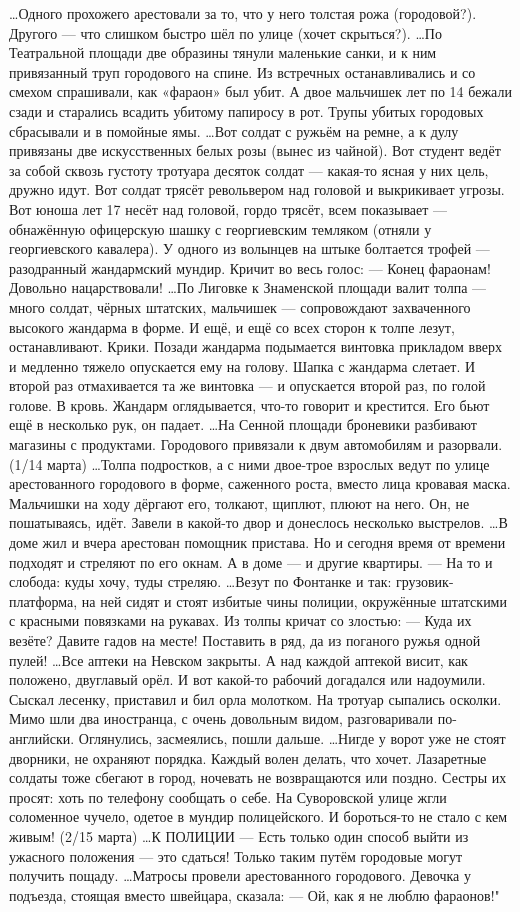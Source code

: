 …Одного прохожего арестовали за то, что у него толстая рожа (городовой?). Другого — что слишком быстро шёл по улице (хочет скрыться?).
…По Театральной площади две образины тянули маленькие санки, и к ним привязанный труп городового на спине. Из встречных останавливались и со смехом спрашивали, как «фараон» был убит. А двое мальчишек лет по 14 бежали сзади и старались всадить убитому папиросу в рот.
Трупы убитых городовых сбрасывали и в помойные ямы.
…Вот солдат с ружьём на ремне, а к дулу привязаны две искусственных белых розы (вынес из чайной). Вот студент ведёт за собой сквозь густоту тротуара десяток солдат — какая-то ясная у них цель, дружно идут. Вот солдат трясёт револьвером над головой и выкрикивает угрозы. Вот юноша лет 17 несёт над головой, гордо трясёт, всем показывает — обнажённую офицерскую шашку с георгиевским темляком (отняли у георгиевского кавалера).
У одного из волынцев на штыке болтается трофей — разодранный жандармский мундир. Кричит во весь голос:
— Конец фараонам! Довольно нацарствовали!
…По Лиговке к Знаменской площади валит толпа — много солдат, чёрных штатских, мальчишек — сопровождают захваченного высокого жандарма в форме. И ещё, и ещё со всех сторон к толпе лезут, останавливают. Крики.
Позади жандарма подымается винтовка прикладом вверх и медленно тяжело опускается ему на голову. Шапка с жандарма слетает. И второй раз отмахивается та же винтовка — и опускается второй раз, по голой голове. В кровь. Жандарм оглядывается, что-то говорит и крестится. Его бьют ещё в несколько рук, он падает.
…На Сенной площади броневики разбивают магазины с продуктами. Городового привязали к двум автомобилям и разорвали.
(1/14 марта)
…Толпа подростков, а с ними двое-трое взрослых ведут по улице арестованного городового в форме, саженного роста, вместо лица кровавая маска. Мальчишки на ходу дёргают его, толкают, щиплют, плюют на него. Он, не пошатываясь, идёт.
Завели в какой-то двор и донеслось несколько выстрелов.
…В доме жил и вчера арестован помощник пристава. Но и сегодня время от времени подходят и стреляют по его окнам. А в доме — и другие квартиры.
— На то и слобода: куды хочу, туды стреляю.
…Везут по Фонтанке и так: грузовик-платформа, на ней сидят и стоят избитые чины полиции, окружённые штатскими с красными повязками на рукавах.
Из толпы кричат со злостью:
— Куда их везёте? Давите гадов на месте! Поставить в ряд, да из поганого ружья одной пулей!
…Все аптеки на Невском закрыты. А над каждой аптекой висит, как положено, двуглавый орёл.
И вот какой-то рабочий догадался или надоумили. Сыскал лесенку, приставил и бил орла молотком. На тротуар сыпались осколки.
Мимо шли два иностранца, с очень довольным видом, разговаривали по-английски. Оглянулись, засмеялись, пошли дальше.
…Нигде у ворот уже не стоят дворники, не охраняют порядка. Каждый волен делать, что хочет.
Лазаретные солдаты тоже сбегают в город, ночевать не возвращаются или поздно. Сестры их просят: хоть по телефону сообщать о себе.
На Суворовской улице жгли соломенное чучело, одетое в мундир полицейского. И бороться-то не стало с кем живым!
(2/15 марта)
…К ПОЛИЦИИ — Есть только один способ выйти из ужасного положения — это сдаться! Только таким путём городовые могут получить пощаду.
…Матросы провели арестованного городового. Девочка у подъезда, стоящая вместо швейцара, сказала:
— Ой, как я не люблю фараонов!"
